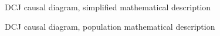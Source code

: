 \documentclass[
  authoryear,
  preprint,
  1p]{elsarticle}
\begin{document}
\begin{figure}


\caption{\label{fig-SciModel_simp2}DCJ causal diagram, simplified
mathematical description}

\end{figure}%

\begin{figure}


\caption{\label{fig-SciModel_pop}DCJ causal diagram, population
mathematical description}

\end{figure}%
\end{document}
